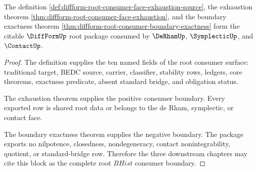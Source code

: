 \begin{theorem}
\label{thm:diffform-root-downstream-consumer-unblock-package}
The definition
\autoref{def:diffform-root-consumer-face-exhaustion-source}, the exhaustion
theorem \autoref{thm:diffform-root-consumer-face-exhaustion}, and the boundary
exactness theorem \autoref{thm:diffform-root-consumer-boundary-exactness} form
the citable $\DiffFormUp$ root package consumed by $\DeRhamUp$,
$\SymplecticUp$, and $\ContactUp$.
\end{theorem}
\begin{proof}
The definition supplies the ten named fields of the root consumer surface:
traditional target, BEDC source, carrier, classifier, stability rows, ledgers,
core theorems, exactness predicate, absent standard bridge, and obligation
status.

The exhaustion theorem supplies the positive consumer boundary. Every exported
row is shared root data or belongs to the de Rham, symplectic, or contact face.

The boundary exactness theorem supplies the negative boundary. The package
exports no nilpotence, closedness, nondegeneracy, contact nonintegrability,
quotient, or standard-bridge row. Therefore the three downstream chapters may
cite this block as the complete root $BHist$ consumer boundary.
\end{proof}
